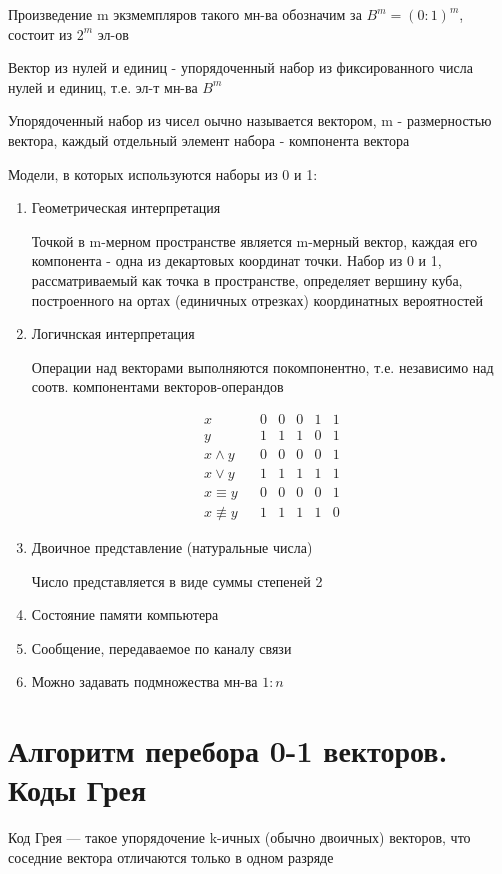 \documentclass[12pt, fleqn]{article}
\begin{document}
Произведение m экзмемпляров такого мн-ва обозначим за $B^m=(0:1)^m$, состоит из $2^m$ эл-ов
\begin{definition}
  Вектор из нулей и единиц - упорядоченный набор из фиксированного числа нулей и единиц, т.е. эл-т мн-ва $B^m$
\end{definition}
Упорядоченный набор из чисел оычно называется вектором, m - размерностью вектора, каждый отдельный элемент набора - компонента вектора
\begin{remark}
  Модели, в которых используются наборы из 0 и 1:
  \begin{enumerate}
    \item Геометрическая интерпретация

    Точкой в m-мерном пространстве является m-мерный вектор, каждая его компонента - одна из декартовых координат точки. Набор из 0 и 1, рассматриваемый как точка в пространстве, определяет вершину куба, построенного на ортах (единичных отрезках) координатных вероятностей
    \item Логичнская интерпретация

    Операции над векторами выполняются покомпонентно, т.е. независимо над соотв. компонентами векторов-операндов
    \begin{Example}
      \[\begin{matrix}
        x && 0 & 0 & 0 & 1 & 1\\
        y && 1 & 1 & 1 & 0 & 1\\
        x \wedge y && 0 & 0 & 0 & 0 & 1\\
        x \vee y && 1 & 1 & 1 & 1 & 1\\
        x \equiv y && 0 & 0 & 0 & 0 & 1\\
        x \not \equiv y && 1 & 1 & 1 & 1 & 0
      \end{matrix}\]
    \end{Example}
    \item Двоичное представление (натуральные числа)

    Число представляется в виде суммы степеней 2
    \item Состояние памяти компьютера
    \item Сообщение, передаваемое по каналу связи
    \item Можно задавать подмножества мн-ва $1:n$
  \end{enumerate}
\end{remark}

\section{Алгоритм перебора 0-1 векторов. Коды Грея}
\begin{definition}
  Код Грея — такое упорядочение k-ичных (обычно двоичных) векторов, что соседние вектора отличаются только в одном разряде
\end{definition}
\end{document}
